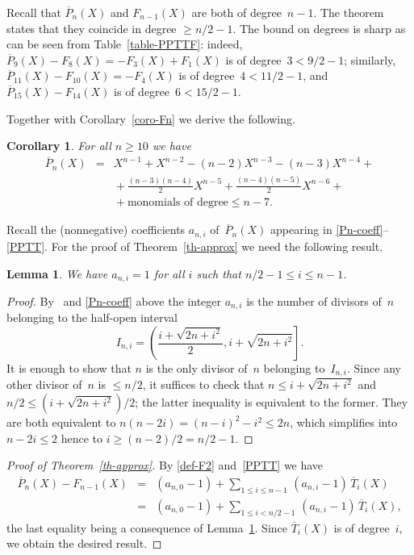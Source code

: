 \documentclass[11pt, a4paper]{amsart}
\newtheorem{lemma}[theorem]{Lemma}
\newtheorem{coro}[theorem]{Corollary}
\theoremstyle{definition}
\newcommand\Pg{\overline{P}}
\newcommand\TT{\overline{T}}
\numberwithin{equation}{section}
\begin{document}
Recall that $\Pg_n(X)$ and $F_{n-1}(X)$ are both of degree~$n-1$. 
The theorem states that they coincide in degree $\geq n/2-1$.
The bound on degrees is sharp as can be seen from Table~\ref{table-PPTTF}:
indeed, $\Pg_9(X) - F_8(X) = - F_3(X) + F_1(X)$ is of degree~$3 < 9/2 - 1$; 
similarly, $\Pg_{11}(X) - F_{10}(X) = - F_4(X)$ is of degree~$4 < 11/2 - 1$,
and $\Pg_{15}(X) - F_{14}(X)$ is of degree~$6 < 15/2 - 1$.

Together with Corollary~\ref{coro-Fn} we derive the following.

\begin{coro}
For all $n \geq 10$ we have
\begin{eqnarray*}
\Pg_n(X) & = & X^{n-1} + X^{n-2} - (n-2) X^{n-3} - (n-3) X^{n-4} + \\
&& {} + \frac{(n-3)(n-4)}{2} X^{n-5} + \frac{(n-4)(n-5)}{2} X^{n-6} + \\
&& {} + \text{monomials of degree} \leq n-7 .
\end{eqnarray*}
\end{coro}

Recall the (nonnegative) coefficients $a_{n,i}$ of~$\Pg_n(X)$ appearing in \eqref{Pn-coeff}--\eqref{PPTT}.
For the proof of Theorem~\ref{th-approx} we need the following result.

\begin{lemma}\label{lem-ani}
We have $a_{n,i} = 1$ for all $i$ such that $n/2 - 1 \leq i \leq n-1$.
\end{lemma}

\begin{proof}
By~\cite[Thm.~1.3]{KR3} and \eqref{Pn-coeff} above
the integer $a_{n,i}$ is the number of divisors of~$n$ belonging to the half-open interval 
\[
I_{n,i} = \left( \frac{i + \sqrt{2n+ i^2}}{2}, i + \sqrt{2n+ i^2} \right] .
\]
It is enough to show that $n$ is the only divisor of~$n$ belonging to~$I_{n,i}$. Since any other divisor of~$n$ is $\leq n/2$,
it suffices to check that $n \leq i + \sqrt{2n+ i^2}$ and $n/2 \leq (i + \sqrt{2n+ i^2})/2$; the latter inequality  is equivalent to the former.
They are both equivalent to $n(n-2i) = (n - i)^2 - i^2 \leq 2n$, which simplifies into $n-2i \leq 2$ hence to $i \geq (n-2)/2= n/2 - 1$.
\end{proof}

\begin{proof}[Proof of Theorem~\ref{th-approx}]
By \eqref{def-F2} and~\eqref{PPTT} we have
\begin{eqnarray*}
\Pg_n(X) - F_{n-1}(X) 
& = & (a_{n,0} - 1)  + \sum_{1 \leq i \leq n - 1} \, (a_{n,i} -1) \, \TT_i(X) \\
& = & (a_{n,0} - 1)  + \sum_{1 \leq i < n/2 - 1} \, (a_{n,i} -1) \, \TT_i(X) ,
\end{eqnarray*}
the last equality being a consequence of Lemma~\ref{lem-ani}.
Since $\TT_i(X)$ is of degree~$i$, we obtain the desired result.
\end{proof}
 
\end{document}
